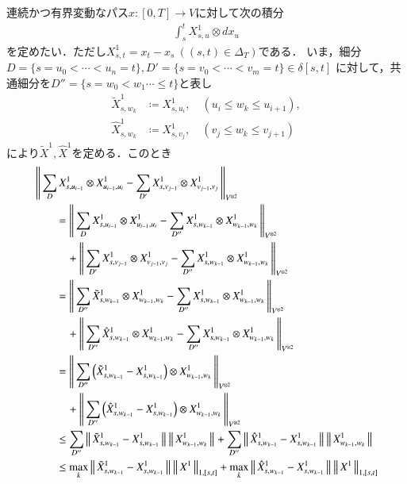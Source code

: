 	連続かつ有界変動なパス$x:[0,T] \longrightarrow V$に対して次の積分
	\begin{align}
		\int_s^t X^1_{s,u} \otimes d x_u
	\end{align}
	を定めたい．ただし$X^1_{s,t} = x_t - x_s\ ((s,t) \in \Delta_T)$である．
	いま，細分$D=\{s=u_0 < \cdots <u_n= t\},D'=\{s=v_0 < \cdots <v_m= t\} \in \delta[s,t]$
	に対して，共通細分を$D''=\{s=w_0 < w_1 \cdots \leq t\}$と表し
	\begin{align}
		\tilde{X}^1_{s,w_k} &\coloneqq X^1_{s,u_i},
		\quad (u_i \leq w_k \leq u_{i+1}), \\
		\hat{X}^1_{s,w_k} &\coloneqq X^1_{s,v_j},
		\quad (v_j \leq w_k \leq v_{j+1})
	\end{align}
	により$\tilde{X}^1,\hat{X}^1$を定める．このとき
	\begin{align}
		&\left\|\,  \sum_D X^1_{s,u_{i-1}} \otimes X^1_{u_{i-1},u_i} - 
			\sum_{D'} X^1_{s,v_{j-1}} \otimes X^1_{v_{j-1},v_j}\, \right\|_{V^{\otimes 2}} \\
		&\qquad= \left\|\,  \sum_D X^1_{s,u_{i-1}} \otimes X^1_{u_{i-1},u_i} - 
			\sum_{D''} X^1_{s,w_{k-1}} \otimes X^1_{w_{k-1},w_k}\, \right\|_{V^{\otimes 2}} \\
			&\quad\qquad + \left\|\,  \sum_{D'} X^1_{s,v_{j-1}} \otimes X^1_{v_{j-1},v_j} - 
			\sum_{D''} X^1_{s,w_{k-1}} \otimes X^1_{w_{k-1},w_k}\, \right\|_{V^{\otimes 2}} \\
		&\qquad= \left\|\,  \sum_{D''} \tilde{X}^1_{s,w_{k-1}} \otimes X^1_{w_{k-1},w_k} - 
			\sum_{D''} X^1_{s,w_{k-1}} \otimes X^1_{w_{k-1},w_k}\, \right\|_{V^{\otimes 2}} \\
			&\quad\qquad + \left\|\,  \sum_{D''} \hat{X}^1_{s,w_{k-1}} \otimes X^1_{w_{k-1},w_k} - 
			\sum_{D''} X^1_{s,w_{k-1}} \otimes X^1_{w_{k-1},w_k}\, \right\|_{V^{\otimes 2}} \\
		&\qquad= \left\|\,  \sum_{D''} \left(\tilde{X}^1_{s,w_{k-1}} -  X^1_{s,w_{k-1}} \right)
		 	\otimes X^1_{w_{k-1},w_k}\, \right\|_{V^{\otimes 2}} \\
			&\quad\qquad + \left\|\,  \sum_{D''} \left( \hat{X}^1_{s,w_{k-1}} - X^1_{s,w_{k-1}} \right)
			 \otimes X^1_{w_{k-1},w_k}\, \right\|_{V^{\otimes 2}} \\
		&\qquad \leq \sum_{D''} \left\|\, \tilde{X}^1_{s,w_{k-1}} -  X^1_{s,w_{k-1}}\, \right\|_{} \left\|\, X^1_{w_{k-1},w_k}\, \right\|_{}
			+ \sum_{D''} \left\|\, \hat{X}^1_{s,w_{k-1}} -  X^1_{s,w_{k-1}}\, \right\|_{} \left\|\, X^1_{w_{k-1},w_k}\, \right\|_{} \\
		&\qquad \leq \operatorname*{max}_{k} \left\|\, \tilde{X}^1_{s,w_{k-1}} -  X^1_{s,w_{k-1}}\, \right\|_{} 
			\left\|\, X^1\, \right\|_{1,[s,t]} + \operatorname*{max}_{k} \left\|\, \hat{X}^1_{s,w_{k-1}} -  X^1_{s,w_{k-1}}\, \right\|_{} 
			\left\|\, X^1\, \right\|_{1,[s,t]}
	\end{align}
